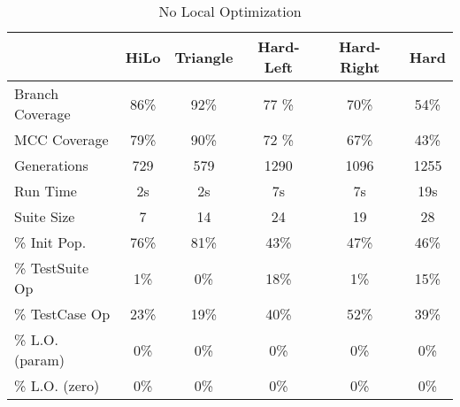 \documentclass[runningheads]{llncs}
\begin{document}
\begin{table}[h!]
	\begin{center}
		
		\def\arraystretch{1.2}%
		\setlength\tabcolsep{1em}
		\begin{tabular}{| l | c  c  c  c c |}
			\hline
							 & HiLo  		 & Triangle		& Hard-Left	& 	Hard-Right 		& Hard		\\ \hline
			Branch Coverage	 & 86\%          & 92\%      	& 77 \%      	& 70\%          & 54\%      \\ \hline
			MCC Coverage	 & 79\%          & 90\%        	& 72 \%      	& 67\%          & 43\%      \\ \hline
			Generations		 & 729           & 579          & 1290       	& 1096          & 1255      \\ \hline
			Run Time		 & 2s          	 & 2s           & 7s       	 	& 7s          	& 19s       \\ \hhline{|=|=====|}
			
			Suite Size       & 7        	& 14       	 	& 24			& 19          	& 28        \\ \hline
			\% Init Pop.     & 76\%         & 81\%       	& 43\%       	& 47\%         	& 46\%      \\ \hline
			\% TestSuite Op  & 1\%          & 0\%       	& 18\%			& 1\%          	& 15\%       \\ \hline
			\% TestCase  Op  & 23\%         & 19\%       	& 40\%      	& 52\%         	& 39\%       \\ \hline
			\% L.O. (param)  & 0\%          & 0\%       	& 0\%			& 0\%          	& 0\%       \\ \hline
			\% L.O. (zero)   & 0\%          & 0\%       	& 0\%      		& 0\%         	& 0\%       \\ \hline
		\end{tabular}
	\end{center}
	\caption{No Local Optimization}  
	\label{tab:noLO}
\end{table}
\end{document}
